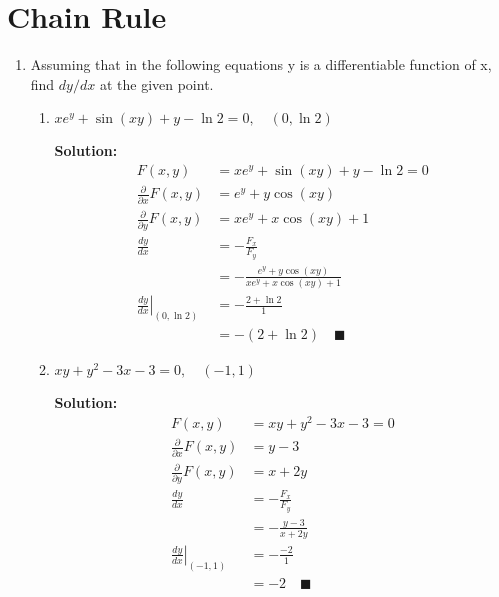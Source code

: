 \documentclass[letterpaper, 11pt]{article}
\begin{document}
\section{Chain Rule}
\begin{enumerate}
\item Assuming that in the following equations y is a differentiable function of x, find $dy/dx$ at the given point. 
\begin{enumerate}[label=(\alph*)]
\item $xe^y + \sin(xy) + y - \ln 2 = 0, \quad (0, \ln 2)$
\par \textbf{Solution:}
\begin{align*}
F(x,y) &=  xe^y + \sin(xy) + y - \ln 2 = 0 \\
\frac{\partial}{\partial x} F(x,y) &= e^y + y\cos(xy) \\
\frac{ \partial}{\partial y} F(x,y) &= xe^y + x \cos(xy) + 1 \\
\frac{dy}{dx} &= - \frac{ F_x}{F_y} \\
& = -\frac{ e^y + y\cos(xy)}{ xe^y + x \cos(xy) + 1} \\
\left. \frac{dy}{dx}\right|_{(0,\ln 2)} &=  -\frac{ 2 + \ln 2 }{1} \\
&= - (2 + \ln 2) \quad\blacksquare 
\end{align*}

\item $xy + y^2 - 3x - 3 = 0, \quad (-1,1)$
\par \textbf{Solution:}
\begin{align*}
F(x,y) &= xy + y^2 - 3x - 3 = 0 \\
\frac{\partial}{\partial x} F(x,y) &= y -3  \\
\frac{ \partial}{\partial y} F(x,y) &= x + 2 y \\
\frac{dy}{dx} &= - \frac{ F_x}{F_y} \\
& = -\frac{ y -3 }{ x + 2 y} \\
\left. \frac{dy}{dx}\right|_{(-1, 1)} &=  -\frac{ -2 }{1} \\
&= - 2 \quad\blacksquare 
\end{align*}


\end{enumerate}


\end{enumerate}
\end{document}
